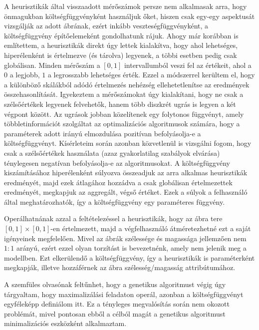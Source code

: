 A heurisztikák által visszaadott mérőszámok persze nem alkalmasak arra, hogy önmagukban költségfüggvényként használjuk őket, hiszen csak egy-egy aspektusát vizsgálják az adott ábrának, ezért inkább veszteségfüggvényként, a költségfüggvény építőelemeként gondolhatunk rájuk. Ahogy már korábban is említettem, a heurisztikák direkt úgy lettek kialakítva, hogy ahol lehetséges, hiperélenként is értelmezve (és tárolva) legyenek, a többi esetben pedig csak globálisan. Minden mérőszám a $[0, 1]$ intervallumból veszi fel az értékeit, ahol a $0$ a legjobb, $1$ a legrosszabb lehetséges érték. Ezzel a módszerrel kerültem el, hogy a különböző skálákból adódó értelmezés nehézség ellehetetlenítse az eredmények összehasonlítását.  Igyekeztem a mérőszámokat úgy kialakítani, hogy ne csak a szélsőértékek legyenek felvehetők, hanem több diszkrét ugrás is legyen a két végpont között. Az ugrások jobban közelítenek egy folytonos függvényt, amely többletinformációt szolgáltat az optimalizációs algoritmusok számára, hogy a paraméterek adott irányú elmozdulása pozitívan befolyásolja-e a költségfüggvényt. Kísérleteim során azonban közvetlenül is vizsgálni fogom, hogy csak a szélsőértékek használata (azaz gyakorlatilag szabályok elvárása) ténylegesen negatívan befolyásolja-e az algoritmusokat. A költségfüggvény kiszámításához hiperélenként súlyozva összeadjuk az arra alkalmas heurisztikák eredményét, majd ezek átlagához hozzádva a csak globálisan értelmezettek eredményét, megkapjuk az aggregált, végső értéket. Ezek a súlyok a felhasználó által meghatározhatók, így a költségfüggvény egy paraméteres függvény.

\begin{note}
Operálhatnának azzal a feltételezéssel a heurisztikák, hogy az ábra tere $[0,1] \times [0,1]$-en értelmezett, majd a végfelhasználó átméretezhetné ezt a saját igényeinek megfelelően. Mivel az ábrák szélessége és magassága jellemzően nem $1:1$ arányú, ezért ezzel olyan torzítást is bevezetnénk, amely nem jelenik meg a modellben. Ezt elkerülendő a költségfüggvény, így a heurisztikák is paraméterként megkapják, illetve hozzáférnek az ábra szélesség/magasság attribútumához.
\end{note}

\begin{note}
A szemfüles olvasónak feltűnhet, hogy a genetikus algoritmust végig úgy tárgyaltam, hogy maximalizálási feladaton operál, azonban a költségfüggvényt egyféleképp definiálom itt. Ez a tényleges megvalósítás során nem okozott problémát, mivel pontosan ebből a célból magát a genetikus algoritmust minimalizációs eszközként alkalmaztam.
\end{note}


